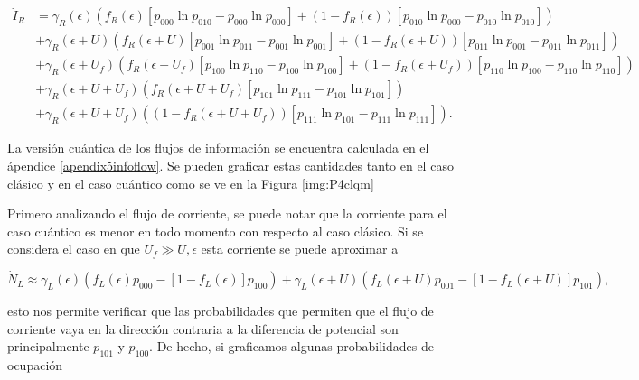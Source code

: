\begin{align*}
 \dot{I}_{R} & =  \gamma_{R}(\epsilon)(f_{R}(\epsilon)[p_{000}\ln p_{010} - p_{000}\ln p_{000}] + (1-f_{R}(\epsilon))[p_{010}\ln p_{000} - p_{010}\ln p_{010} ] )  \\ 
      & + \gamma_{R}(\epsilon + U)(f_{R}(\epsilon + U)[p_{001}\ln p_{011} - p_{001}\ln p_{001}] + (1-f_{R}(\epsilon + U))[p_{011}\ln p_{001} -p_{011}\ln p_{011} ]   ) \\  
      & + \gamma_{R}(\epsilon + U_{f})( f_{R}(\epsilon + U_{f})[p_{100}\ln p_{110} -p_{100}\ln p_{100} ]  + (1-f_{R}(\epsilon + U_{f}))[p_{110}\ln p_{100} - p_{110}\ln p_{110} ] ) \\  
      & + \gamma_{R}(\epsilon + U + U_{f})( f_{R}(\epsilon + U + U_{f})[p_{101}\ln p_{111}- p_{101}\ln p_{101}]) \\   
      & + \gamma_{R}(\epsilon + U + U_{f})( (1-f_{R}(\epsilon+U+U_{f}) )[p_{111}\ln p_{101} - p_{111}\ln p_{111}]).   
\end{align*}

La versión cuántica de los flujos de información se encuentra calculada en el ápendice \ref{apendix5infoflow}. Se pueden graficar estas cantidades tanto en el caso clásico y en el caso cuántico como se ve en la Figura \ref{img:P4clqm}


Primero analizando el flujo de corriente, se puede notar que la corriente para el caso cuántico es menor en todo momento con respecto al caso clásico. Si se considera el caso en que $U_{f}\gg U,\epsilon$ esta corriente se puede aproximar a  

\begin{equation}
    \dot{N}_{L} \approx  \gamma_{L}(\epsilon)( f_{L}(\epsilon)p_{000} - [1-f_{L}(\epsilon)]p_{100} ) +  \gamma_{L}(\epsilon+U)(f_{L}(\epsilon+U)p_{001} - [1-f_{L}(\epsilon+U)]p_{101} )
    ,\label{sec:clqmeq1}
\end{equation}

esto nos permite verificar que las probabilidades que permiten que el flujo de corriente vaya en la dirección contraria a la diferencia de potencial son principalmente $p_{101}$ y $p_{100}$. De hecho, si graficamos algunas probabilidades de ocupación

